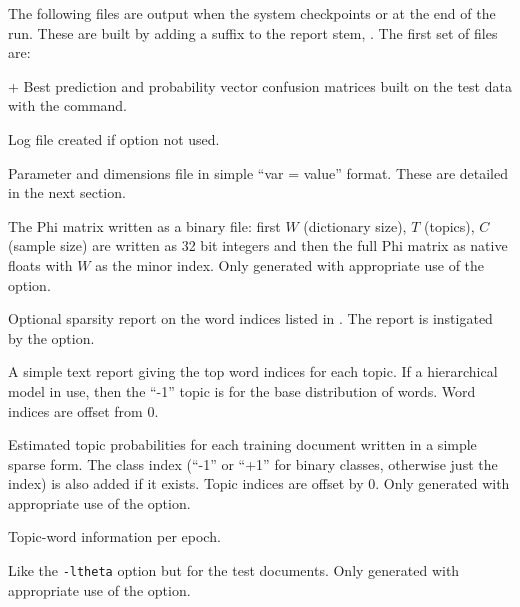 \documentclass[a4paper,english]{article}
\begin{document}
The following files are output when the system checkpoints 
or at the end of the run.
These are built by adding a suffix to the report stem,
.
The first set of files are:
\begin{Description}\setlength{\itemsep}{0cm}
\item[\File{RepStem.cnfs}+\File{RepStem.pcnfs}]  
Best prediction and probability vector confusion matrices
built on the test data with the 
 command.
\item[\File{RepStem.log}] Log file created if  option not used.
\item[\File{RepStem.par}] Parameter and dimensions file in simple ``var = value'' format.  These are detailed in the next section.
\item[\File{RepStem.phi}] The Phi matrix written as a binary file:
first $W$ (dictionary size), $T$ (topics), 
$C$ (sample size) are written as 32 bit integers and
then the full Phi matrix as native floats with $W$ as the minor index.
Only generated with appropriate use of the
 option.
\item[\File{RepStem.smap}] Optional sparsity report on the 
word indices listed in .
The report is instigated by the
 option.

\item[\File{RepStem.top}] A simple text report giving the top word indices
  for each topic.  If a hierarchical model in use, then the
``-1'' topic is for the base distribution of words.
Word indices are offset from 0.
\item[\File{RepStem.theta}] Estimated topic probabilities 
for each training document
written in a simple sparse form.  The class index
(``-1'' or ``+1'' for binary classes, otherwise just the index)
is also added if it exists.
Topic indices are offset by 0.
Only generated with appropriate use of the
 option.
\item[\File{RepStem.tpk}] Topic-word information per epoch.
\item[\File{RepStem.testprob}] 
Like the \texttt{-ltheta} option but for the test documents.
Only generated with appropriate use of the
 option.
\end{Description}
\end{document}
